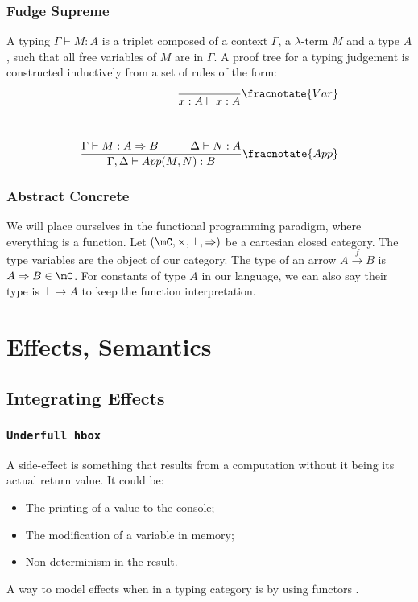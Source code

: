 \documentclass[math, english, info, noamsthm]{beamercours}
\begin{document}
\begin{frame}
	\frametitle{Fudge Supreme}
\begin{definition}
	A typing $\Gamma\vdash M: A$ is a triplet composed of a context $\Gamma$, a $\lambda$-term $M$ and a type $A$, such that all free variables of $M$ are in $\Gamma$.
	A proof tree for a typing judgement is constructed inductively from a set of rules of the form:
	\begin{align*}
		\frac{}{x:A \vdash x:A}\fracnotate{Var}\\[1cm]
		\frac{\Gamma\vdash M:A \Rightarrow B \hspace{1cm} \Delta \vdash N:A}{\Gamma, \Delta\vdash App(M, N):B}\fracnotate{App}
	\end{align*}
\end{definition}
\end{frame}

\begin{frame}
	\frametitle{Abstract Concrete}
	We will place ourselves in the functional programming paradigm, where everything is a function.
	Let $\left(\mC, \times, \bot, \Rightarrow\right)$ be a cartesian closed category. The type variables are the object of our category.\pause
	The type of an arrow $A \xrightarrow{f} B$ is $A \Rightarrow B \in \mC$.
	For constants of type $A$ in our language, we can also say their type is $\bot \to A$ to keep the function interpretation.
\end{frame}

\section{Effects, Semantics}
\subsection{Integrating Effects}
\begin{frame}
	\frametitle{\texttt{Underfull hbox}}
	A side-effect is something that results from a computation without it being its actual return value. It could be:\pause
	\begin{itemize}
		\item The printing of a value to the console; \pause
		\item The modification of a variable in memory; \pause
		\item Non-determinism in the result.
	\end{itemize}
	\pause
	A way to model effects when in a typing category is by using functors \cite{moggiComputationalLambdacalculusMonads1989}.
\end{frame}
\end{document}
